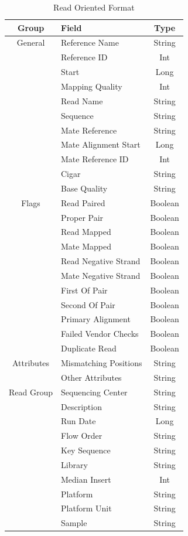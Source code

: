\documentclass[10pt,twocolumn]{article}
\begin{document}
\begin{table}[h]
\caption{Read Oriented Format}
\label{tab:read-oriented-format}
\begin{center}
\begin{tabular}{| c | l | c |}
\hline
\bf Group & \bf Field & \bf Type \\
\hline
General & Reference Name & String \\
 & Reference ID & Int \\
 & Start & Long \\
 & Mapping Quality & Int \\
 & Read Name & String \\
 & Sequence & String \\
 & Mate Reference & String \\
 & Mate Alignment Start & Long \\
 & Mate Reference ID & Int \\
 & Cigar & String \\
 & Base Quality & String \\
\hline
Flags & Read Paired & Boolean \\
 & Proper Pair & Boolean \\
 & Read Mapped & Boolean \\
 & Mate Mapped & Boolean \\
 & Read Negative Strand & Boolean \\
 & Mate Negative Strand & Boolean \\
 & First Of Pair & Boolean \\
 & Second Of Pair & Boolean \\
 & Primary Alignment & Boolean \\
 & Failed Vendor Checks & Boolean \\
 & Duplicate Read & Boolean \\
\hline
Attributes & Mismatching Positions & String \\
 & Other Attributes & String \\
\hline
Read Group & Sequencing Center & String \\
 & Description & String \\
 & Run Date & Long \\
 & Flow Order & String \\
 & Key Sequence & String \\
 & Library & String \\
 & Median Insert & Int \\
 & Platform & String \\
 & Platform Unit & String \\
 & Sample & String \\
\hline
\end{tabular}
\end{center}
\end{table}
\end{document}
